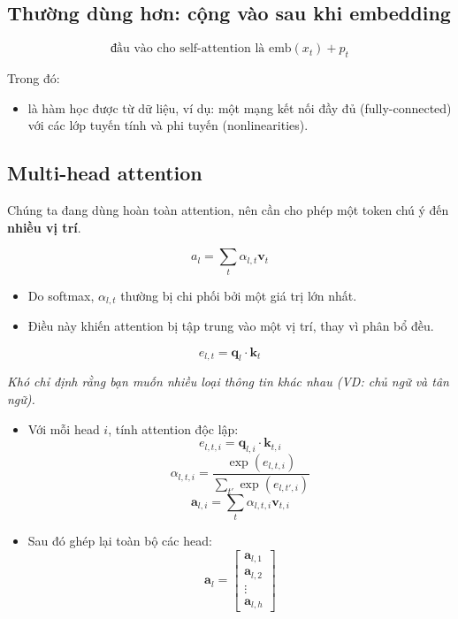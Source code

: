 \documentclass{book}
\begin{document}
    \subsection*{Thường dùng hơn: cộng vào sau khi embedding}
    \[
    \text{đầu vào cho self-attention là } \text{emb}(x_t) + p_t
    \]
    
    Trong đó:
    \begin{itemize}
        \item {} là hàm học được từ dữ liệu, ví dụ: một mạng kết nối đầy đủ (fully-connected) với các lớp tuyến tính và phi tuyến (nonlinearities).
    \end{itemize}
    \subsection{Multi-head attention}
    
    Chúng ta đang dùng hoàn toàn attention, nên cần cho phép một token chú ý đến \textbf{nhiều vị trí}.
    
    \[
    a_l = \sum_t \alpha_{l,t} \mathbf{v}_t
    \]
    
    \begin{itemize}
      \item Do softmax, $\alpha_{l,t}$ thường bị chi phối bởi một giá trị lớn nhất.
      \item Điều này khiến attention bị tập trung vào một vị trí, thay vì phân bổ đều.
    \end{itemize}
    
    \[
    e_{l,t} = \mathbf{q}_l \cdot \mathbf{k}_t
    \]
    
    \textit{Khó chỉ định rằng bạn muốn nhiều loại thông tin khác nhau (VD: chủ ngữ và tân ngữ).}

    \begin{itemize}
      \item Với mỗi head $i$, tính attention độc lập:
      \[
      e_{l,t,i} = \mathbf{q}_{l,i} \cdot \mathbf{k}_{t,i}
      \]
      \[
      \alpha_{l,t,i} = \frac{\exp(e_{l,t,i})}{\sum_{t'} \exp(e_{l,t',i})}
      \]
      \[
      \mathbf{a}_{l,i} = \sum_t \alpha_{l,t,i} \mathbf{v}_{t,i}
      \]
    
      \item Sau đó ghép lại toàn bộ các head:
      \[
      \mathbf{a}_l = \begin{bmatrix}
        \mathbf{a}_{l,1} \\
        \mathbf{a}_{l,2} \\
        \vdots \\
        \mathbf{a}_{l,h}
      \end{bmatrix}
      \]
    \end{itemize}
    
\end{document}
